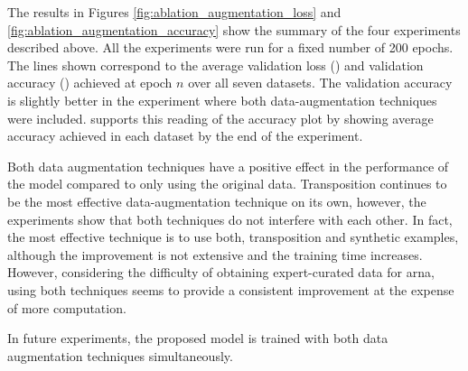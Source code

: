 
The results in Figures \ref{fig:ablation_augmentation_loss}
and \ref{fig:ablation_augmentation_accuracy} show the
summary of the four experiments described above. All the
experiments were run for a fixed number of 200 epochs. The
lines shown correspond to the average validation loss
() and validation
accuracy () achieved
at epoch $n$ over all seven datasets. The validation
accuracy is slightly better in the experiment where both
data-augmentation techniques were included.
 supports this reading of the
accuracy plot by showing average accuracy achieved in each
dataset by the end of the experiment.




Both data augmentation techniques have a positive effect in
the performance of the model compared to only using the
original data. Transposition continues to be the most
effective data-augmentation technique on its own, however,
the experiments show that both techniques do not interfere
with each other. In fact, the most effective technique is to
use both, transposition and synthetic examples, although the
improvement is not extensive and the training time
increases. However, considering the difficulty of obtaining
expert-curated data for \gls{arna}, using both techniques
seems to provide a consistent improvement at the expense of
more computation.

In future experiments, the proposed model is trained with
both data augmentation techniques simultaneously.
